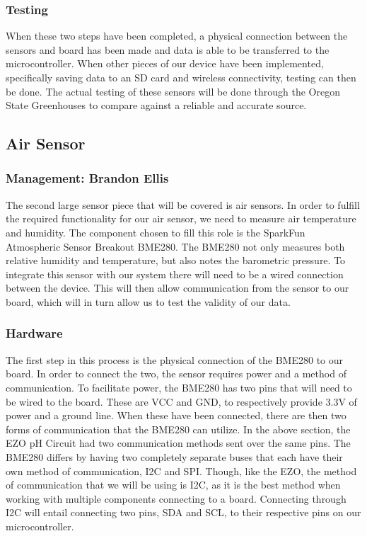 \documentclass[IEEEtran,letterpaper,10pt,titlepage,fleqn,draftclsnofoot,onecolumn]{article}
\begin{document}
\subsubsection{Testing}

When these two steps have been completed, a physical connection between the sensors and board has been made and data is able to be transferred to the microcontroller. When other pieces of our device have been implemented, specifically saving data to an SD card and wireless connectivity, testing can then be done. The actual testing of these sensors will be done through the Oregon State Greenhouses to compare against a reliable and accurate source. 

\subsection{Air Sensor}
\subsubsection{Management: Brandon Ellis}

The second large sensor piece that will be covered is air sensors. In order to fulfill the required functionality for our air sensor, we need to measure air temperature and humidity. The component chosen to fill this role is the SparkFun Atmospheric Sensor Breakout BME280. The BME280 not only measures both relative humidity and temperature, but also notes the barometric pressure. To integrate this sensor with our system there will need to be a wired connection between the device. This will then allow communication from the sensor to our board, which will in turn allow us to test the validity of our data.

\subsubsection{Hardware}

The first step in this process is the physical connection of the BME280 to our board. In order to connect the two, the sensor requires power and a method of communication. To facilitate power, the BME280 has two pins that will need to be wired to the board. These are VCC and GND, to respectively provide 3.3V of power and a ground line. When these have been connected, there are then two forms of communication that the BME280 can utilize. In the above section, the EZO pH Circuit had two communication methods sent over the same pins. The BME280 differs by having two completely separate buses that each have their own method of communication, I2C and SPI. Though, like the EZO, the method of communication that we will be using is I2C, as it is the best method when working with multiple components connecting to a board. Connecting through I2C will entail connecting two pins, SDA and SCL, to their respective pins on our microcontroller.
\end{document}
